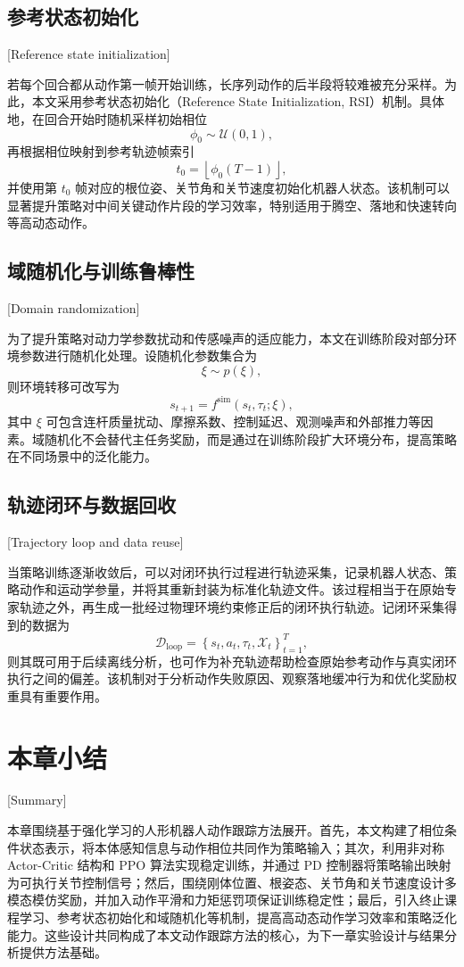 \subsection{参考状态初始化}[Reference state initialization]

若每个回合都从动作第一帧开始训练，长序列动作的后半段将较难被充分采样。为此，本文采用参考状态初始化（Reference State Initialization, RSI）机制\cite{deepmimic2018}。具体地，在回合开始时随机采样初始相位
\begin{equation}
\phi_0\sim\mathcal{U}(0,1),
\end{equation}
再根据相位映射到参考轨迹帧索引
\begin{equation}
t_0=\left\lfloor \phi_0(T-1)\right\rfloor,
\end{equation}
并使用第 $t_0$ 帧对应的根位姿、关节角和关节速度初始化机器人状态。该机制可以显著提升策略对中间关键动作片段的学习效率，特别适用于腾空、落地和快速转向等高动态动作。

\subsection{域随机化与训练鲁棒性}[Domain randomization]

为了提升策略对动力学参数扰动和传感噪声的适应能力，本文在训练阶段对部分环境参数进行随机化处理。设随机化参数集合为
\begin{equation}
\xi\sim p(\xi),
\end{equation}
则环境转移可改写为
\begin{equation}
s_{t+1}
=
f^{\mathrm{sim}}(s_t,\tau_t;\xi),
\end{equation}
其中 $\xi$ 可包含连杆质量扰动、摩擦系数、控制延迟、观测噪声和外部推力等因素。域随机化不会替代主任务奖励，而是通过在训练阶段扩大环境分布，提高策略在不同场景中的泛化能力。

\subsection{轨迹闭环与数据回收}[Trajectory loop and data reuse]

当策略训练逐渐收敛后，可以对闭环执行过程进行轨迹采集，记录机器人状态、策略动作和运动学参量，并将其重新封装为标准化轨迹文件。该过程相当于在原始专家轨迹之外，再生成一批经过物理环境约束修正后的闭环执行轨迹。记闭环采集得到的数据为
\begin{equation}
\mathcal{D}_{\mathrm{loop}}
=
\left\{
s_t,a_t,\tau_t,\mathcal{X}_t
\right\}_{t=1}^{T},
\end{equation}
则其既可用于后续离线分析，也可作为补充轨迹帮助检查原始参考动作与真实闭环执行之间的偏差。该机制对于分析动作失败原因、观察落地缓冲行为和优化奖励权重具有重要作用。

\section{本章小结}[Summary]

本章围绕基于强化学习的人形机器人动作跟踪方法展开。首先，本文构建了相位条件状态表示，将本体感知信息与动作相位共同作为策略输入；其次，利用非对称 Actor-Critic 结构和 PPO 算法实现稳定训练，并通过 PD 控制器将策略输出映射为可执行关节控制信号；然后，围绕刚体位置、根姿态、关节角和关节速度设计多模态模仿奖励，并加入动作平滑和力矩惩罚项保证训练稳定性；最后，引入终止课程学习、参考状态初始化和域随机化等机制，提高高动态动作学习效率和策略泛化能力。这些设计共同构成了本文动作跟踪方法的核心，为下一章实验设计与结果分析提供方法基础。
